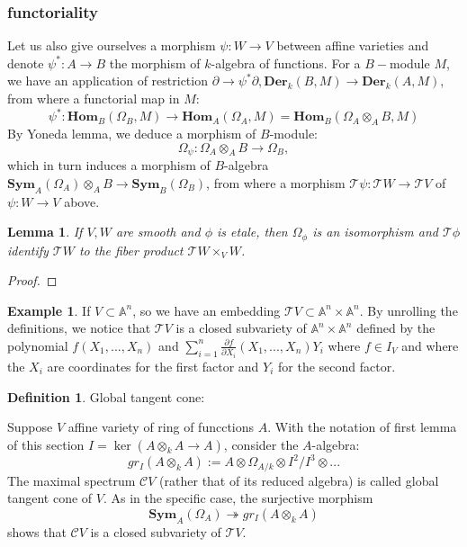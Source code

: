 \documentclass[12pt,a4paper,english]{article}
\theoremstyle{plain}
\newtheorem{lem}[thm]{Lemma}
\theoremstyle{definition}
\newtheorem{defi}{Definition}
\newtheorem*{example}{Example}
\theoremstyle{remark}
\newcommand{\homo}{\mathbf{Hom}}
\newcommand{\der}{\textbf{Der}}
\newcommand{\sym}{\textbf{Sym}}
\begin{document}
\subsubsection{functoriality}
Let us also give ourselves a morphism $\psi:W\rightarrow V$ between affine varieties and denote $\psi^{*}:A\rightarrow B$ the morphism of $k$-algebra of functions. For a $B-$module $M$, we have an application of restriction $\partial\rightarrow \psi^{*}\partial, \der_{k}(B,M)\rightarrow \der_{k}(A,M)$, from where a functorial map in $M$:
\begin{equation*}
    \psi^{*}:\homo_{B}(\Omega_{B}, M)\rightarrow \homo_{A}(\Omega_{A}, M)=\homo_{B}(\Omega_{A}\otimes_{A}B, M)
\end{equation*}
By Yoneda lemma, we deduce a morphism of $B$-module:
\begin{equation*}
    \Omega_{\psi}:\Omega_{A}\otimes_{A}B\rightarrow \Omega_{B},
\end{equation*}
which in turn induces a morphism of $B$-algebra $\sym_{A}(\Omega_{A})\otimes_{A}B\rightarrow \sym_{B}(\Omega_{B})$, from where a morphism $\mathcal{T}\psi:\mathcal{T}W\rightarrow \mathcal{T}V$ of $\psi:W\rightarrow V$ above.
\begin{lem}
If $V, W$ are smooth and $\phi$ is etale, then $\Omega_{\phi}$ is an isomorphism and $\mathcal{T}\phi$ identify $\mathcal{T}W$ to the fiber product $\mathcal{T}W\times_{V}W$.
\end{lem}
\begin{proof}

\end{proof}
\begin{example}
If $V\subset\mathbb{A}^{n}$, so we have an embedding $\mathcal{T}V\subset \mathbb{A}^{n}\times\mathbb{A}^{n}$. By unrolling the definitions, we notice that $\mathcal{T}V$ is a closed subvariety of $\mathbb{A}^{n}\times\mathbb{A}^{n}$ defined by the polynomial $f(X_{1},...,X_{n})$ and $\sum^{n}_{i=1}\frac{\partial f}{\partial X_{i}}(X_{1},...,X_{n})Y_{i} $ where $f\in I_{V}$ and where the $X_{i}$ are coordinates for the first factor and $Y_{i}$ for the second factor.
\end{example}
\begin{defi}
Global tangent cone:

Suppose $V$ affine variety of ring of funcctions $A$. With the notation of first lemma of this section $I=\ker(A\otimes_{k}A\rightarrow A) $, consider the $A$-algebra:
\begin{equation*}
    gr_{I}(A\otimes_{k}A):=A\otimes\Omega_{A/k}\otimes I^{2}/I^{3}\otimes... 
\end{equation*}
The maximal spectrum $\mathcal{C}V$ (rather that of its reduced algebra) is called global tangent cone of $V$. As in the specific case, the surjective morphism
\begin{equation*}
    \sym_{A}(\Omega_{A})\twoheadrightarrow gr_{I}(A\otimes_{k}A)
\end{equation*}
shows that $\mathcal{C}V$ is a closed subvariety of $\mathcal{T}V$.

\end{defi}
\end{document}
